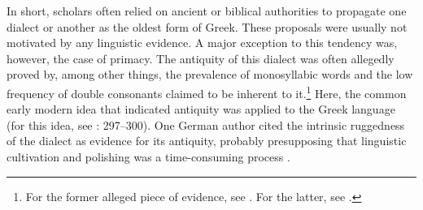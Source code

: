 In short, scholars often relied on ancient or biblical authorities to propagate one dialect or another as the oldest form of Greek. These proposals were usually not motivated by any linguistic evidence. A major exception to this tendency was, however, the case of  primacy. The antiquity of this dialect was often allegedly proved by, among other things, the prevalence of monosyllabic words and the low frequency of double consonants claimed to be inherent to it.\footnote{For the former alleged piece of evidence, see \citet[17]{Munthe1748}. For the latter, see \citet[\textsc{xxvi}]{Harles1778}.} Here, the common early modern idea that  indicated antiquity was applied to the Greek language (for this idea, see \citealt{Jansen1995}: 297–300). One German author cited the intrinsic ruggedness of the  dialect as evidence for its antiquity, probably presupposing that linguistic cultivation and polishing was a time-consuming process \citep[21]{Gedike1782}.\largerpage

